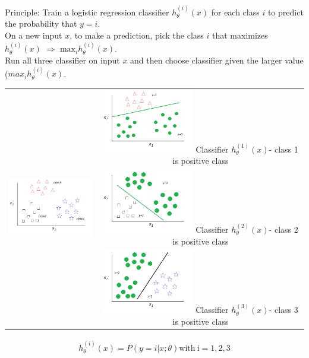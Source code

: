 \documentclass[a4paper,12pt]{report}
\begin{document}
Principle: Train a logistic regression classifier $h_{\theta}^{(i)} (x)$ for each class $i$ to predict the probability that $y=i$.\\
On a new input $x$, to make a prediction, pick the class $i$ that maximizes $h_{\theta}^{(i)}(x)$ $\Rightarrow$ $\mathrm{max}_{i} h_{\theta}^{(i)}(x)$.\\
Run all three classifier on input $x$ and then choose classifier given the larger value ($max_{i} h_{\theta}^{(i)}(x)$.
\begin{table}[!htb]
\centering
\begin{tabular}{c|c}
 & \includegraphics[width=4cm]{multiclassh1.png}
\tiny{Classifier $h_{\theta} ^{(1)}(x)$- class 1 is positive class}
 \\
\includegraphics[width=5cm]{multiclass.png} & \includegraphics[width=4cm]{multiclassh2.png}
\tiny{Classifier $h_{\theta} ^{(2)}(x)$- class 2 is positive class} \\
& \includegraphics[width=4cm]{multiclassh3.png}
\tiny{Classifier $h_{\theta} ^{(3)}(x)$- class 3 is positive class}
\end{tabular}
\end{table}
\begin{align*}
h_{\theta}^{(i)} (x) = P(y=i|x;\theta) \mathrm{with\  i=1,2,3}
\end{align*}
\end{document}
